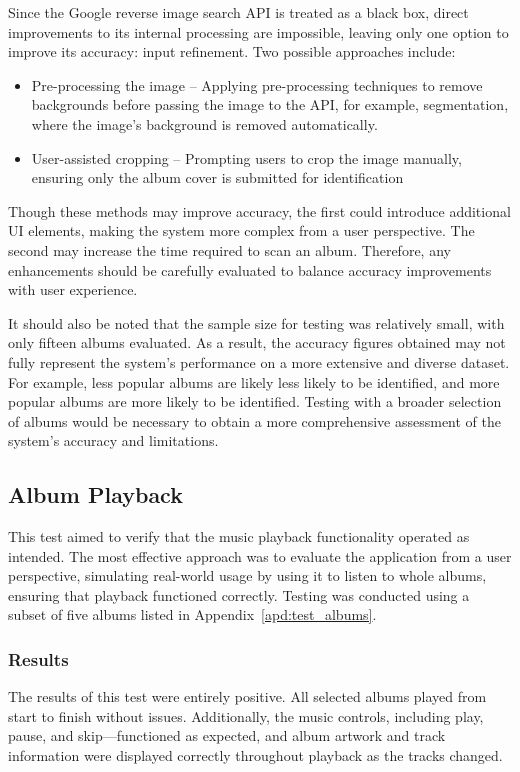 Since the Google reverse image search API is treated as a black box, direct improvements to its internal processing are impossible, leaving only one option to improve its accuracy: input refinement. Two possible approaches include:

\begin{itemize}
    \item Pre-processing the image – Applying pre-processing techniques to remove backgrounds before passing the image to the API, for example, segmentation, where the image's background is removed automatically. %
    \item User-assisted cropping – Prompting users to crop the image manually, ensuring only the album cover is submitted for identification
\end{itemize}

Though these methods may improve accuracy, the first could introduce additional UI elements, making the system more complex from a user perspective. The second may increase the time required to scan an album. Therefore, any enhancements should be carefully evaluated to balance accuracy improvements with user experience.

It should also be noted that the sample size for testing was relatively small, with only fifteen albums evaluated. As a result, the accuracy figures obtained may not fully represent the system's performance on a more extensive and diverse dataset. For example, less popular albums are likely less likely to be identified, and more popular albums are more likely to be identified. Testing with a broader selection of albums would be necessary to obtain a more comprehensive assessment of the system's accuracy and limitations.

\subsection{Album Playback}
This test aimed to verify that the music playback functionality operated as intended. The most effective approach was to evaluate the application from a user perspective, simulating real-world usage by using it to listen to whole albums, ensuring that playback functioned correctly.
\ifshowappendix
Testing was conducted using a subset of five albums listed in Appendix~\ref{apd:test_albums}.
\fi

\subsubsection{Results}
The results of this test were entirely positive. All selected albums played from start to finish without issues. Additionally, the music controls, including play, pause, and skip—functioned as expected, and album artwork and track information were displayed correctly throughout playback as the tracks changed.


